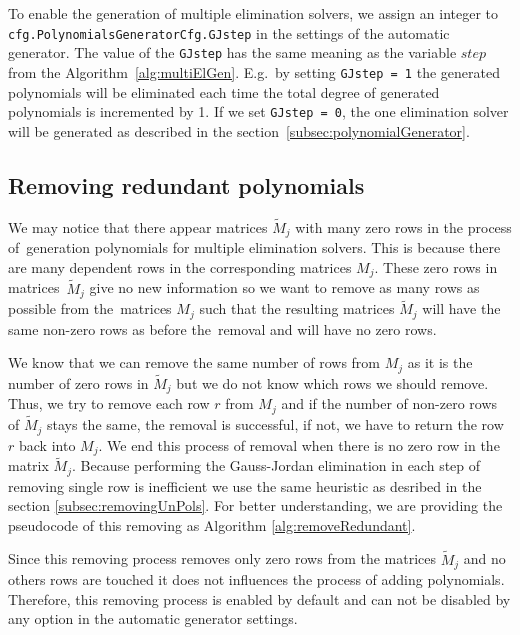 To enable the generation of multiple elimination solvers, we assign an integer to \texttt{cfg.Poly\-nomials\-Gene\-rator\-Cfg.GJstep} in the settings of the automatic generator. The value of the \texttt{GJstep} has the same meaning as the variable $step$ from the Algorithm~\ref{alg:multiElGen}. E.g.\ by setting \texttt{GJstep = 1} the generated polynomials will be eliminated each time the total degree of generated polynomials is incremented by 1. If we set \texttt{GJstep~=~0}, the one elimination solver will be generated as described in the section~\ref{subsec:polynomialGenerator}.

\subsection{Removing redundant polynomials}
\label{subsec:removeRedundant}
We may notice that there appear matrices $\tilde{M}_j$ with many zero rows in the process of~generation polynomials for multiple elimination solvers. This is because there are many dependent rows in the corresponding matrices $M_j$. These zero rows in matrices~$\tilde{M}_j$ give no new information so we want to remove as many rows as possible from the~matrices $M_j$ such that the resulting matrices $\tilde{M}_j$ will have the same non-zero rows as before the~removal and will have no zero rows.

We know that we can remove the same number of rows from $M_j$ as it is the number of zero rows in $\tilde{M}_j$ but we do not know which rows we should remove. Thus, we try to remove each row $r$ from $M_j$ and if the number of non-zero rows of $\tilde{M}_j$ stays the same, the removal is successful, if not, we have to return the row $r$ back into $M_j$. We end this process of removal when there is no zero row in the matrix $\tilde{M}_j$. Because performing the Gauss-Jordan elimination in each step of removing single row is inefficient we use the same heuristic as desribed in the section \ref{subsec:removingUnPols}. For better understanding, we are providing the pseudocode of this removing as Algorithm \ref{alg:removeRedundant}.



Since this removing process removes only zero rows from the matrices $\tilde{M}_j$ and no others rows are touched it does not influences the process of adding polynomials. Therefore, this removing process is enabled by default and can not be disabled by any option in the automatic generator settings.

